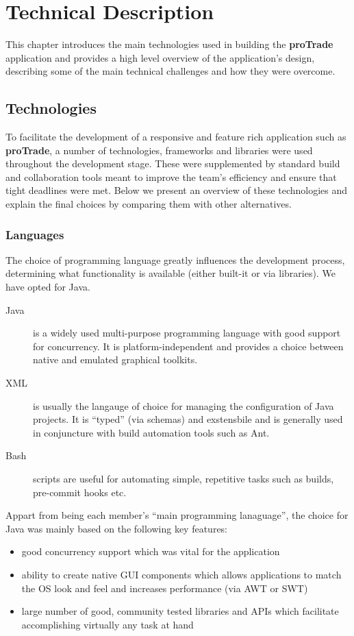 \documentclass[10pt]{report}
\newcommand{\nm}{{\bf proTrade}}
\newcommand{\nmsp}{{\nm \ }}
\begin{document}
\chapter{Technical Description}

This chapter introduces the main technologies used in building the {\nmsp} application and provides a high level overview of the application's design, describing some of the main technical challenges and how they were overcome.

\section{Technologies}
To facilitate the development of a responsive and feature rich application such as {\nm}, a number of technologies, frameworks and libraries were used throughout the development stage. These were supplemented by standard build and collaboration tools meant to improve the team's efficiency and ensure that tight deadlines were met.
Below we present an overview of these technologies and explain the final choices by comparing them with other alternatives.

\subsection{Languages}

The choice of programming language greatly influences the development process, determining what functionality is available (either built-it or via libraries). We have opted for Java.

\begin{description}
\item[Java] is a widely used multi-purpose programming language with good support for concurrency. It is platform-independent and provides a choice between native and emulated graphical toolkits. 

\item[XML] is usually the langauge of choice for managing the configuration of Java projects. It is ``typed'' (via schemas) and exstensbile and is generally used in conjuncture with build automation tools such as Ant.

\item[Bash] scripts are useful for automating simple, repetitive tasks such as builds, pre-commit hooks etc.

\end{description}

Appart from being each member's ``main programming lanaguage'', the choice for Java was mainly based on the following key features:
\begin{itemize}
  \item good concurrency support which was vital for the application 
  \item ability to create native GUI components which allows applications to match the OS look and feel and increases performance (via AWT or SWT)
  \item large number of good, community tested libraries and APIs which facilitate accomplishing virtually any task at hand
\end{itemize}
\end{document}
